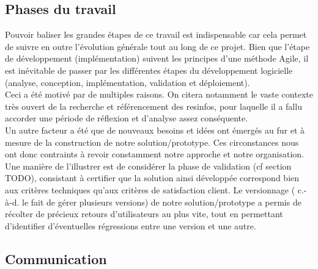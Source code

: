 \subsection*{Phases du travail}


Pouvoir baliser les grandes étapes de ce travail est indispensable car cela permet de suivre en outre l'évolution générale tout au long de ce projet. Bien que l'étape de développement (implémentation) suivent les principes d'une méthode Agile\cite{agileManifeste}, il est inévitable de passer par les différentes étapes du développement logicielle (analyse, conception, implémentation, validation et déploiement). \\

Ceci a été motivé par de multiples raisons. On citera notamment le vaste contexte très ouvert de la recherche et référencement des \glspl{resinfo}, pour laquelle il a fallu accorder une période de réflexion et d'analyse assez conséquente. \\

Un autre facteur a été que de nouveaux besoins et idées ont émergés au fur et à mesure de la construction de notre solution/prototype. Ces circonstances nous ont donc contraints à revoir constamment notre approche et notre organisation. 
Une manière de l'illustrer est de considérer la phase de validation (cf section TODO), consistant à certifier que la solution ainsi développée correspond bien aux critères techniques qu'aux critères de satisfaction client. Le versionnage ( c.-à-d. le fait de gérer plusieurs versions) de notre solution/prototype a permis de récolter de précieux retours d'utilisateurs au plus vite, tout en permettant d'identifier d'éventuelles régressions entre une version et une autre. \\

\subsection*{Communication}


